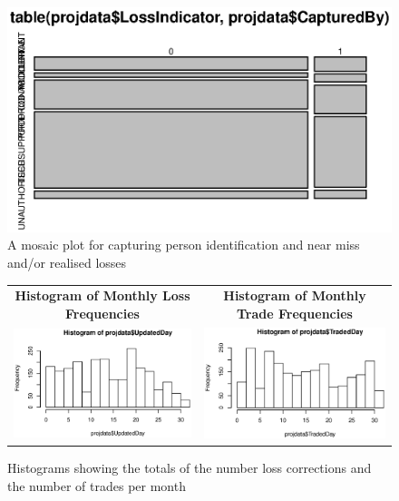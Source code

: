 \documentclass[a4paper]{article}
\begin{document}
\begin{figure}
\centering
\includegraphics[scale=0.7]{Rplot04.eps}
\caption[Mosaic Plot for Losses]{A mosaic plot for capturing person identification and near miss and/or realised losses}
\label{Fig2}
\end{figure}


\begin{figure}
\begin{frame}
      \centering
       \begin{tabular}{cc}
        \textbf{Histogram of Monthly Loss Frequencies} & \textbf{Histogram of Monthly Trade Frequencies} \\
        \includegraphics[width=7.5cm]{Rplot02.eps}
         &
         \includegraphics[width=7cm]{Rplot03.eps}
         \end{tabular}
    \end{frame}
    \caption{Histograms showing the totals of the number loss corrections and the number of trades per month}
    \label{Fig3}
\end{figure}
\end{document}
